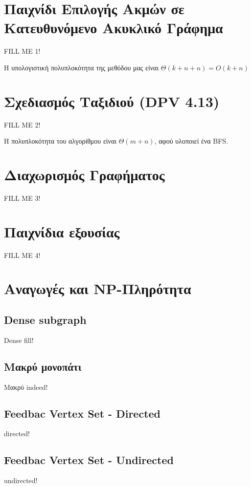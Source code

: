 \documentclass[a4paper,11pt]{article}
\begin{document}
\renewcommand{\labelenumi}{\roman{enumi})}
\renewcommand{\labelenumii}{ (\arabic{enumii}) }



\section{Παιχνίδι Επιλογής Ακμών σε Κατευθυνόμενο Ακυκλικό Γράφημα} \setcounter{section}{1}
FILL ME 1!

Η υπολογιστική πολυπλοκότητα της μεθόδου μας είναι $\Theta(k + n + n) =
O(k + n)$


\section{Σχεδιασμός Ταξιδιού (DPV 4.13)}
FILL ME 2!

Η πολυπλοκότητα του αλγορίθμου είναι $\Theta(m + n)$, αφού υλοποιεί ένα BFS.


\section{Διαχωρισμός Γραφήματος}
FILL ME 3!


\section{Παιχνίδια εξουσίας}
FILL ME 4!


\section{Αναγωγές και NP-Πληρότητα}
\subsection{Dense subgraph}
Dense fill!
\subsection{Μακρύ μονοπάτι}
Μακρύ indeed!
\subsection{Feedbac Vertex Set - Directed}
directed!
\subsection{Feedbac Vertex Set - Undirected}
undirected!

\end{document}
